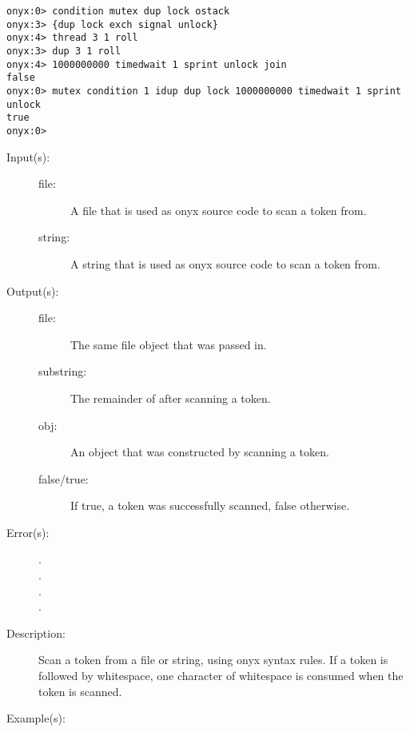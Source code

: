 \begin{description}
\begin{description}
\begin{verbatim}
onyx:0> condition mutex dup lock ostack
onyx:3> {dup lock exch signal unlock}
onyx:4> thread 3 1 roll
onyx:3> dup 3 1 roll
onyx:4> 1000000000 timedwait 1 sprint unlock join
false
onyx:0> mutex condition 1 idup dup lock 1000000000 timedwait 1 sprint unlock
true
onyx:0>
		\end{verbatim}
	\end{description}
\label{systemdict:token}
\item[{\onyxop{file/string}{token}{false}}: ]
\item[{\onyxop{file/string}{token}{file/substring obj true}}: ]
	\begin{description}\item[]
	\item[Input(s): ]
		\begin{description}\item[]
		\item[file: ]
			A file that is used as onyx source code to scan a token
			from.
		\item[string: ]
			A string that is used as onyx source code to scan a
			token from.
		\end{description}
	\item[Output(s): ]
		\begin{description}\item[]
		\item[file: ]
			The same file object that was passed in.
		\item[substring: ]
			The remainder of  after scanning a token.
		\item[obj: ]
			An object that was constructed by scanning a token.
		\item[false/true: ]
			If true, a token was successfully scanned, false
			otherwise.
		\end{description}
	\item[Error(s): ]
		\begin{description}\item[]
		\item[.]
		\item[.]
		\item[.]
		\item[.]
		\end{description}
	\item[Description: ]
		Scan a token from a file or string, using onyx syntax rules.  If
		a token is followed by whitespace, one character of whitespace
		is consumed when the token is scanned.
	\item[Example(s): ]\begin{verbatim}


\end{verbatim}
\end{description}
\end{description}
